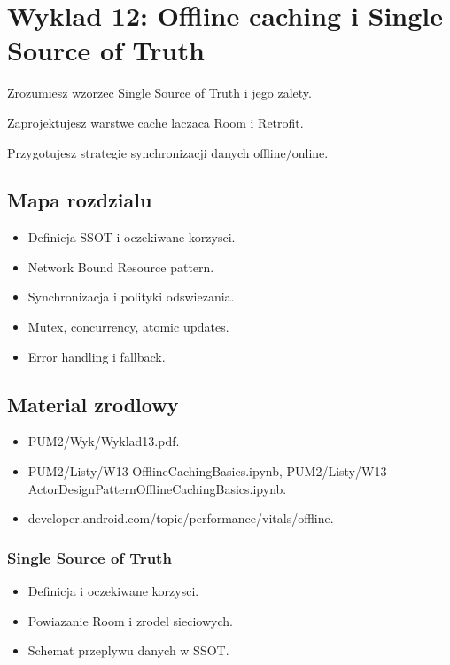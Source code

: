 \chapter{Wyklad 12: Offline caching i Single Source of Truth}

\begin{learningobjectives}
  \item Zrozumiesz wzorzec Single Source of Truth i jego zalety.
  \item Zaprojektujesz warstwe cache laczaca Room i Retrofit.
  \item Przygotujesz strategie synchronizacji danych offline/online.
\end{learningobjectives}

\section{Mapa rozdzialu}
\begin{itemize}
  \item Definicja SSOT i oczekiwane korzysci.
  \item Network Bound Resource pattern.
  \item Synchronizacja i polityki odswiezania.
  \item Mutex, concurrency, atomic updates.
  \item Error handling i fallback.
\end{itemize}

\section{Material zrodlowy}
\begin{itemize}
  \item PUM2/Wyk/Wyklad13.pdf.
  \item PUM2/Listy/W13-OfflineCachingBasics.ipynb, PUM2/Listy/W13-ActorDesignPatternOfflineCachingBasics.ipynb.
  \item developer.android.com/topic/performance/vitals/offline.
\end{itemize}

\subsection{Single Source of Truth}
\begin{itemize}
  \item Definicja i oczekiwane korzysci.
  \item Powiazanie Room i zrodel sieciowych.
  \item Schemat przeplywu danych w SSOT.
\end{itemize}

